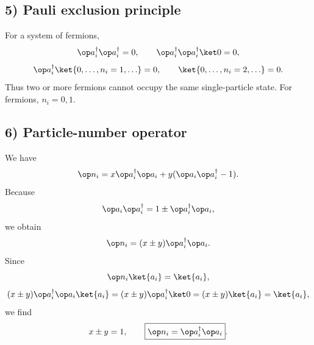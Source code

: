 \subsection*{5) Pauli exclusion principle}
For a system of fermions,
\[\op a_i^\dagger\op a_i^\dagger=0,\qquad
\op a_i^\dagger\op a_i^\dagger\ket0=0,\]
\[\op a_i^\dagger\ket{0,\ldots,n_i=1,\ldots}=0,\qquad
\ket{0,\ldots,n_i=2,\ldots}=0.\]
Thus two or more fermions cannot occupy the same single-particle state. For fermions, $n_i=0,1$.

\subsection*{6) Particle-number operator}
We have
\[\op n_i=x\op a_i^\dagger\op a_i+y(\op a_i\op a_i^\dagger-1).\]
Because
\[\op a_i\op a_i^\dagger=1\pm\op a_i^\dagger\op a_i,\]
we obtain
\[\op n_i=(x\pm y)\op a_i^\dagger\op a_i.\]
Since
\[\op n_i\ket{a_i}=\ket{a_i},\]
\[(x\pm y)\op a_i^\dagger\op a_i\ket{a_i}
=(x\pm y)\op a_i^\dagger\ket0=(x\pm y)\ket{a_i}=\ket{a_i},\]
we find
\[x\pm y=1,\qquad\boxed{\op n_i=\op a_i^\dagger\op a_i}.\]